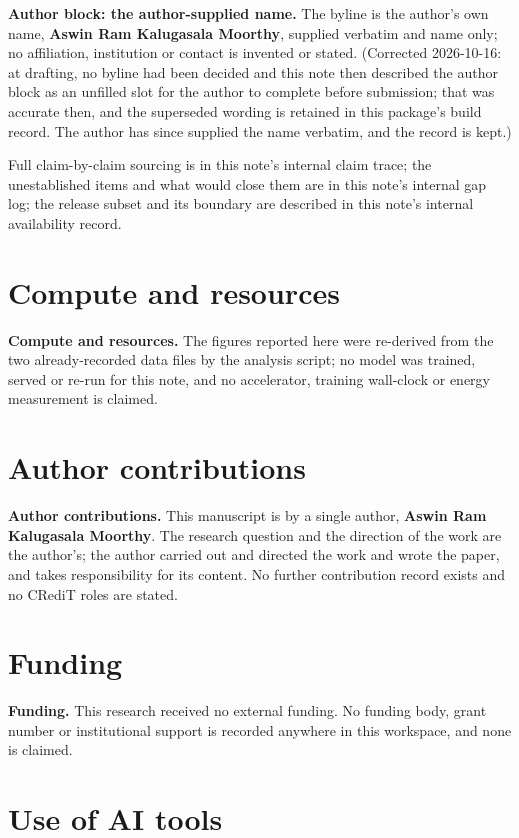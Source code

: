 \documentclass[11pt,a4paper]{article}
\begin{document}
\textbf{Author block: the author-supplied name.} The byline is the author's own name, \textbf{Aswin Ram Kalugasala Moorthy}, supplied verbatim and name only; no affiliation, institution or contact is invented or stated. (Corrected 2026-10-16: at drafting, no byline had been decided and this note then described the author block as an unfilled slot for the author to complete before submission; that was accurate then, and the superseded wording is retained in this package's build record. The author has since supplied the name verbatim, and the record is kept.)

Full claim-by-claim sourcing is in this note's internal claim trace; the unestablished items and what would close them are in this note's internal gap log; the release subset and its boundary are described in this note's internal availability record.

\section*{Compute and resources}

\textbf{Compute and resources.} The figures reported here were re-derived from the two already-recorded data files by the analysis script; no model was trained, served or re-run for this note, and no accelerator, training wall-clock or energy measurement is claimed.

\section*{Author contributions}

\textbf{Author contributions.} This manuscript is by a single author, \textbf{Aswin Ram Kalugasala Moorthy}. The research question and the direction of the work are the author's; the author carried out and directed the work and wrote the paper, and takes responsibility for its content. No further contribution record exists and no CRediT roles are stated.

\section*{Funding}

\textbf{Funding.} This research received no external funding. No funding body, grant number or institutional support is recorded anywhere in this workspace, and none is claimed.

\section*{Use of AI tools}
\end{document}
